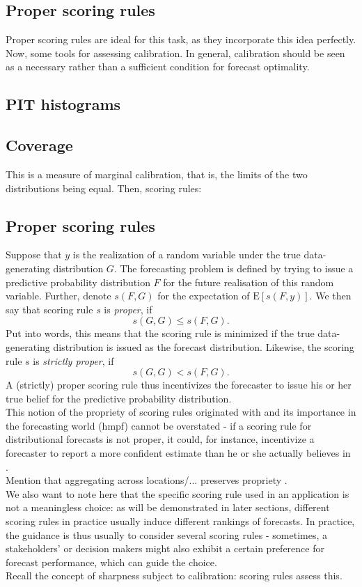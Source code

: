 \subsection{Proper scoring rules}
Proper scoring rules are ideal for this task, as they incorporate this idea perfectly.\\
Now, some tools for assessing calibration. In general, calibration should be seen as a necessary rather than a sufficient condition for forecast optimality.
\subsection{PIT histograms}
\subsection{Coverage}
This is a measure of marginal calibration, that is, the limits of the two distributions being equal.
Then, scoring rules:\\
\subsection{Proper scoring rules}
Suppose that $y$ is the realization of a random variable under the true data-generating distribution $G$. The forecasting problem is defined by trying to issue a predictive probability distribution $F$ for the future realisation of this random variable. Further, denote $s(F,G)$ for the expectation of $\text{E}[s(F,y)]$. We then say that scoring rule $s$ is \textit{proper}, if 
\[s(G,G) \leq s(F,G).\]
Put into words, this means that the scoring rule is minimized if the true data-generating distribution is issued as the forecast distribution. Likewise, the scoring rule $s$ is \textit{strictly proper}, if 
\[s(G,G) < s(F,G).\] 
A (strictly) proper scoring rule thus incentivizes the forecaster to issue his or her true belief for the predictive probability distribution.\\
This notion of the propriety of scoring rules originated with  and its importance in the forecasting world (hmpf) cannot be overstated - if a scoring rule for distributional forecasts is not proper, it could, for instance, incentivize a forecaster to report a more confident estimate than he or she actually believes in . \\
Mention that aggregating across locations/... preserves propriety \citep{bracher_evaluating_2021}.\\
We also want to note here that the specific scoring rule used in an application is not a meaningless choice: as will be demonstrated in later sections, different scoring rules in practice usually induce different rankings of forecasts. In practice, the guidance is thus usually to consider several scoring rules - sometimes, a stakeholders' or decision makers might also exhibit a certain preference for forecast performance, which can guide the choice.\\
Recall the concept of sharpness subject to calibration: scoring rules assess this.
